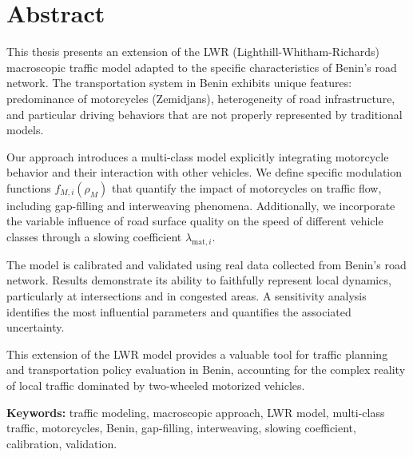 \chapter*{Abstract}
\thispagestyle{empty}

This thesis presents an extension of the LWR (Lighthill-Whitham-Richards) macroscopic traffic model adapted to the specific characteristics of Benin's road network. The transportation system in Benin exhibits unique features: predominance of motorcycles (Zemidjans), heterogeneity of road infrastructure, and particular driving behaviors that are not properly represented by traditional models.

Our approach introduces a multi-class model explicitly integrating motorcycle behavior and their interaction with other vehicles. We define specific modulation functions $f_{M,i}(\rho_M)$ that quantify the impact of motorcycles on traffic flow, including gap-filling and interweaving phenomena. Additionally, we incorporate the variable influence of road surface quality on the speed of different vehicle classes through a slowing coefficient $\lambda_{\text{mat},i}$.

The model is calibrated and validated using real data collected from Benin's road network. Results demonstrate its ability to faithfully represent local dynamics, particularly at intersections and in congested areas. A sensitivity analysis identifies the most influential parameters and quantifies the associated uncertainty.

This extension of the LWR model provides a valuable tool for traffic planning and transportation policy evaluation in Benin, accounting for the complex reality of local traffic dominated by two-wheeled motorized vehicles.

\vspace{1cm}

\noindent \textbf{Keywords:} traffic modeling, macroscopic approach, LWR model, multi-class traffic, motorcycles, Benin, gap-filling, interweaving, slowing coefficient, calibration, validation.
